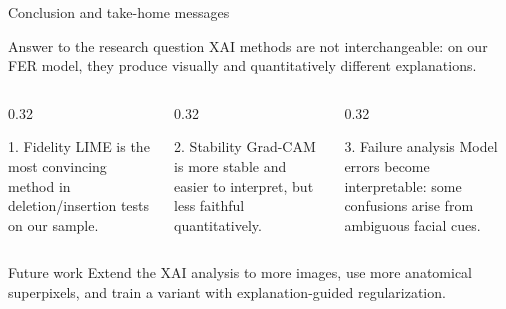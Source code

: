 \documentclass[aspectratio=169,10pt]{beamer}
\begin{document}
\begin{frame}{Conclusion and take-home messages}
  \begin{block}{Answer to the research question}
    XAI methods are not interchangeable: on our FER model, they produce visually and quantitatively different explanations.
  \end{block}

  \begin{columns}[T,totalwidth=\textwidth]
    \begin{column}{0.32\textwidth}
      \begin{block}{1. Fidelity}
        LIME is the most convincing method in deletion/insertion tests on our sample.
      \end{block}
    \end{column}
    \begin{column}{0.32\textwidth}
      \begin{block}{2. Stability}
        Grad-CAM is more stable and easier to interpret, but less faithful quantitatively.
      \end{block}
    \end{column}
    \begin{column}{0.32\textwidth}
      \begin{block}{3. Failure analysis}
        Model errors become interpretable: some confusions arise from ambiguous facial cues.
      \end{block}
    \end{column}
  \end{columns}

  \vspace{0.8em}
  \begin{alertblock}{Future work}
    Extend the XAI analysis to more images, use more anatomical superpixels, and train a variant with explanation-guided regularization.
  \end{alertblock}
\end{frame}

\appendix
\end{document}
